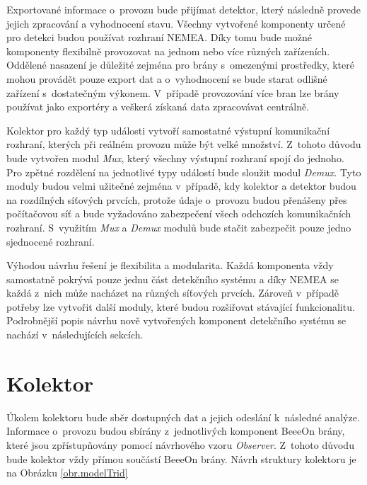 Exportované informace o~provozu bude přijímat detektor, který následně provede jejich zpracování a 
 vyhodnocení stavu. Všechny vytvořené komponenty určené pro detekci budou používat rozhraní 
 NEMEA. Díky tomu bude možné komponenty flexibilně provozovat na jednom nebo více různých zařízeních.
 Oddělené nasazení je důležité zejména pro brány s~omezenými prostředky, které mohou provádět 
 pouze export dat a o~vyhodnocení se bude starat odlišné zařízení s~dostatečným výkonem. V~případě 
 provozování více bran lze brány používat jako exportéry a veškerá získaná data zpracovávat 
 centrálně. 
 
 Kolektor pro každý typ události vytvoří samostatné výstupní komunikační rozhraní, kterých 
 při reálném provozu může být velké množství. Z~tohoto důvodu  
 bude vytvořen modul \textit{Mux}, který všechny výstupní rozhraní spojí do jednoho. 
 Pro zpětné rozdělení na jednotlivé typy událostí bude sloužit modul \textit{Demux}. Tyto moduly budou velmi užitečné
 zejména v~případě, kdy kolektor a detektor budou na rozdílných síťových prvcích, protože údaje 
 o~provozu budou přenášeny přes počítačovou síť a bude vyžadováno zabezpečení všech odchozích komunikačních
 rozhraní. S~využitím \textit{Mux} a \textit{Demux} modulů bude stačit zabezpečit pouze jedno sjednocené rozhraní. 
 
 Výhodou návrhu řešení je flexibilita a modularita. Každá komponenta vždy samostatně pokrývá pouze jednu
 část detekčního systému a díky NEMEA se každá z~nich může nacházet na různých síťových prvcích. Zároveň
 v~případě potřeby lze vytvořit další moduly, které budou rozšiřovat stávající funkcionalitu.
 Podrobnější popis návrhu nově vytvořených komponent detekčního systému se nachází v~následujících sekcích.
 
 \section{Kolektor}
 Úkolem kolektoru bude sběr dostupných dat a jejich odeslání k~následné analýze. Informace
o~provozu budou sbírány z~jednotlivých komponent BeeeOn brány, které jsou zpřístupňovány pomocí 
 návrhového vzoru \textit{Observer}. Z~tohoto důvodu bude kolektor vždy přímou součástí BeeeOn brány. 
 Návrh struktury kolektoru je na Obrázku \ref{obr.modelTrid}
 
